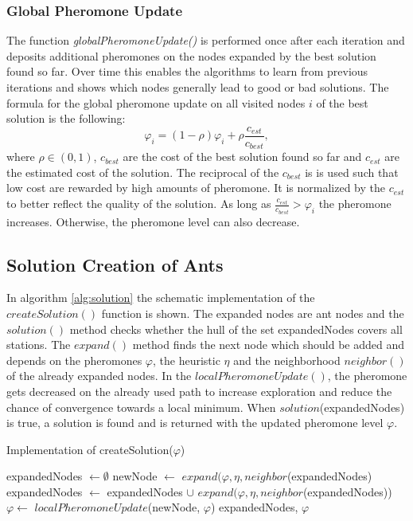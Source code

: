 \subsubsection{Global Pheromone Update}
The function \textit{globalPheromoneUpdate()} is performed once after each iteration and deposits additional pheromones on the nodes expanded by the best solution found so far. Over time this enables the algorithms to learn from previous iterations and shows which nodes generally lead to good or bad solutions. The formula for the global pheromone update on all visited nodes $i$ of the best solution is the following:
$$\varphi_i = (1-\rho) \varphi_i + \rho \frac{c_{est}}{c_{best}},$$
where $\rho \in (0,1)$, $c_{best}$ are the cost of the best solution found so far and $c_{est}$ are the estimated cost of the solution. The reciprocal of the $c_{best}$ is is used such that low cost are rewarded by high amounts of pheromone. It is normalized by the $c_{est}$ to better reflect the quality of the solution. As long as $\frac{c_{est}}{c_{best}} > \varphi_i$ the pheromone increases. Otherwise, the pheromone level can also decrease.

\subsection{Solution Creation of Ants}
In algorithm \ref{alg:solution} the schematic implementation of the $createSolution()$ function is shown. The expanded nodes are ant nodes and the $solution()$ method checks whether the hull of the set expandedNodes covers all stations. The $expand()$ method finds the next node which should be added and depends on the pheromones $\varphi$, the heuristic $\eta$ and the neighborhood $neighbor()$ of the already expanded nodes. In the $localPheromoneUpdate()$, the pheromone gets decreased on the already used path to increase exploration and reduce the chance of convergence towards a local minimum. When $solution$(expandedNodes) is true, a solution is found and is returned with the updated pheromone level $\varphi$. 
\begin{algorithm}[h]
	\caption{Implementation of createSolution($\varphi$)}
	\label{alg:solution}
	\begin{algorithmic}[1]
		\State expandedNodes $\gets \emptyset$
		\State newNode $\gets$ $expand(\varphi, \eta, neighbor$(expandedNodes)
		\State expandedNodes $\gets$ expandedNodes $\cup$ $expand(\varphi, \eta, neighbor$(expandedNodes))
		\State $\varphi \gets$ $localPheromoneUpdate$(newNode, $\varphi$)
		\EndWhile
		\State \Return expandedNodes, $\varphi$
	\end{algorithmic}
\end{algorithm}

